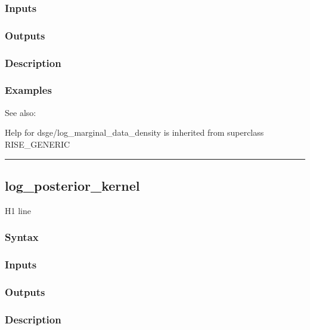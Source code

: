 \documentclass[letterpaper,10pt,english]{sphinxmanual}
\begin{document}
\subsubsection{Inputs}
\label{classes/models/@dsge/dsge:id86}

\subsubsection{Outputs}
\label{classes/models/@dsge/dsge:id87}

\subsubsection{Description}
\label{classes/models/@dsge/dsge:id88}

\subsubsection{Examples}
\label{classes/models/@dsge/dsge:id89}
See also:

Help for dsge/log\_marginal\_data\_density is inherited from superclass RISE\_GENERIC


\bigskip\hrule{}\bigskip



\subsection{log\_posterior\_kernel}
\label{classes/models/@dsge/dsge:log-posterior-kernel}\label{classes/models/@dsge/dsge:id90}
H1 line


\subsubsection{Syntax}
\label{classes/models/@dsge/dsge:id91}

\subsubsection{Inputs}
\label{classes/models/@dsge/dsge:id92}

\subsubsection{Outputs}
\label{classes/models/@dsge/dsge:id93}

\subsubsection{Description}
\label{classes/models/@dsge/dsge:id94}
\end{document}
